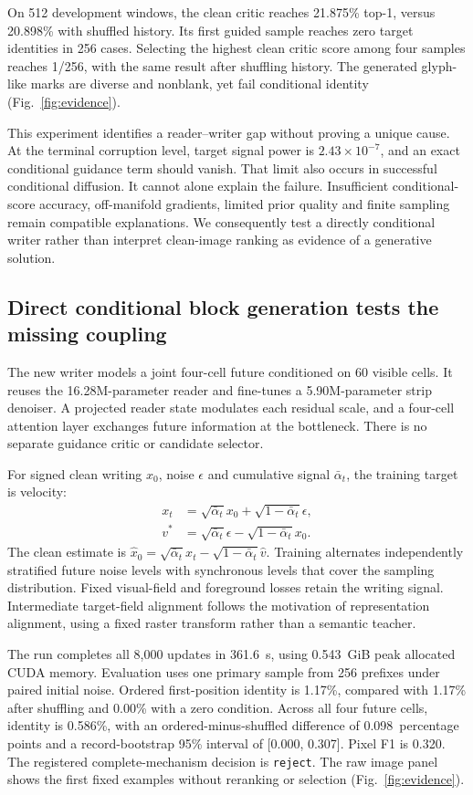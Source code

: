 \documentclass[12pt,a4paper]{article}
\newcommand{\TrainSeconds}{361.6}
\newcommand{\TrainMemory}{0.543}
\newcommand{\FirstIdentity}{1.17}
\newcommand{\FirstShuffled}{1.17}
\newcommand{\FirstZero}{0.00}
\newcommand{\BlockIdentity}{0.586}
\newcommand{\BlockGain}{0.098}
\newcommand{\BlockLow}{0.000}
\newcommand{\BlockHigh}{0.307}
\newcommand{\BlockFone}{0.320}
\newcommand{\RunDecision}{reject}
\begin{document}
On 512 development windows, the clean critic reaches 21.875\% top-1, versus
20.898\% with shuffled history. Its first guided sample reaches zero target
identities in 256 cases. Selecting the highest clean critic score among four
samples reaches 1/256, with the same result after shuffling history. The
generated glyph-like marks are diverse and nonblank, yet fail conditional
identity (Fig.~\ref{fig:evidence}).

This experiment identifies a reader--writer gap without proving a unique
cause. At the terminal corruption level, target signal power is
$2.43\times10^{-7}$, and an exact conditional guidance term should vanish.
That limit also occurs in successful conditional diffusion. It cannot alone
explain the failure. Insufficient conditional-score accuracy, off-manifold
gradients, limited prior quality and finite sampling remain compatible
explanations. We consequently test a directly conditional writer rather than
interpret clean-image ranking as evidence of a generative solution.

\subsection*{Direct conditional block generation tests the missing coupling}
The new writer models a joint four-cell future conditioned on 60 visible
cells. It reuses the 16.28M-parameter reader and fine-tunes a 5.90M-parameter
strip denoiser. A projected reader state modulates each residual scale, and a
four-cell attention layer exchanges future information at the bottleneck.
There is no separate guidance critic or candidate selector.

For signed clean writing $x_0$, noise $\epsilon$ and cumulative signal
$\bar\alpha_t$, the training target is velocity:
\begin{align}
x_t&=\sqrt{\bar\alpha_t}x_0+\sqrt{1-\bar\alpha_t}\epsilon,\\
v^*&=\sqrt{\bar\alpha_t}\epsilon-\sqrt{1-\bar\alpha_t}x_0.
\end{align}
The clean estimate is
$\hat x_0=\sqrt{\bar\alpha_t}x_t-\sqrt{1-\bar\alpha_t}\hat v$.
Training alternates independently stratified future noise levels with
synchronous levels that cover the sampling distribution. Fixed visual-field
and foreground losses retain the writing signal. Intermediate target-field
alignment follows the motivation of representation alignment\cite{repa},
using a fixed raster transform rather than a semantic teacher.

The run completes all 8,000 updates in \TrainSeconds\ s, using
\TrainMemory\ GiB peak allocated CUDA memory. Evaluation uses one primary
sample from 256 prefixes under paired initial noise. Ordered first-position
identity is \FirstIdentity\%, compared with \FirstShuffled\% after shuffling
and \FirstZero\% with a zero condition. Across all four future cells, identity
is \BlockIdentity\%, with an ordered-minus-shuffled difference of
\BlockGain\ percentage points and a record-bootstrap 95\% interval of
[\BlockLow, \BlockHigh]. Pixel F1 is \BlockFone.
The registered complete-mechanism decision is \texttt{\RunDecision}.
The raw image panel shows the first fixed examples without reranking or
selection (Fig.~\ref{fig:evidence}).
\end{document}
